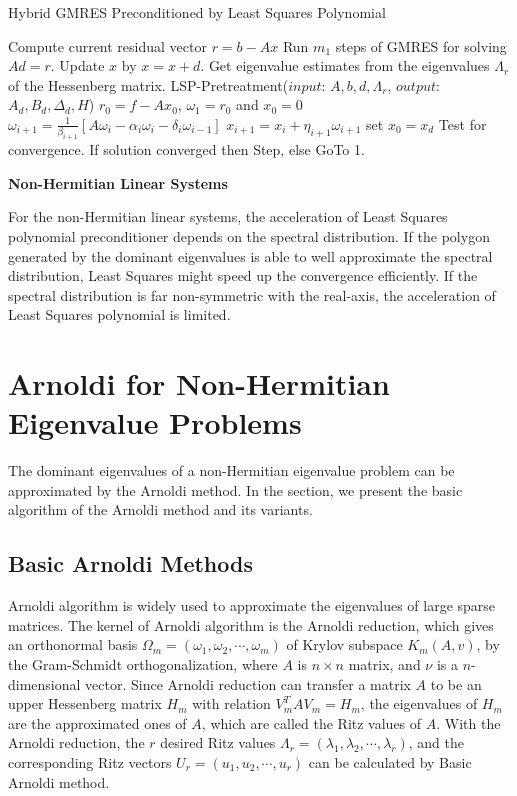 {\begin{algorithm}[htbp]
	\caption{Hybrid GMRES Preconditioned by Least Squares Polynomial}
	\label{alg:hybrid-gmres-ls}
	\begin{algorithmic}[1]
		\State  Compute current residual vector $r=b-Ax$
		\State Run $m_1$ steps of GMRES for solving $Ad = r$.
		\State  Update $x$ by $x=x+d$.
		\State  Get eigenvalue estimates from the eigenvalues $\Lambda_r$ of the Hessenberg matrix.
		\State  LSP-Pretreatment($input$: $A,b,d,\Lambda_r$, $output$: $A_d, B_d, \Delta_d, H$)
		\State  $r_0=f-Ax_0$, $\omega_1 = r_0$ and $x_0=0$
		\State  $\omega_{i+1}=\frac{1}{\beta_{i+1}}[A\omega_i-\alpha_i\omega_i-\delta_i\omega_{i-1}]$
		\State  $x_{i+1}=x_i+\eta_{i+1}\omega_{i+1}$
		\EndFor
		\EndFor
		\State  set $x_0=x_d$
		\State  Test for convergence.
		\State  If solution converged then Step, else GoTo 1.
	\end{algorithmic}
\end{algorithm}

\textbf{Non-Hermitian Linear Systems}

For the non-Hermitian linear systems, the acceleration of Least Squares polynomial preconditioner depends on the spectral distribution. If the polygon generated by the dominant eigenvalues is able to well approximate the spectral distribution, Least Squares might speed up the convergence efficiently. If the spectral distribution is far non-symmetric with the real-axis, the acceleration of Least Squares polynomial is limited. 

\section{Arnoldi for Non-Hermitian Eigenvalue Problems}

The dominant eigenvalues of a non-Hermitian eigenvalue problem can be approximated by the Arnoldi method. In the section, we present the basic algorithm of the Arnoldi method and its variants.

\subsection{Basic Arnoldi Methods}
Arnoldi algorithm \cite{arnoldi1951principle} is widely used to approximate the eigenvalues of large sparse matrices. The kernel of Arnoldi algorithm is the Arnoldi reduction, which gives an orthonormal basis \(\Omega_m = (\omega_1,\omega_2,\cdots,\omega_m)\) of Krylov subspace \(K_m(A,v)\), by the Gram-Schmidt orthogonalization, where \(A\) is  \(n \times n\) matrix, and $\nu$ is a \(n\)-dimensional vector. Since Arnoldi reduction can transfer a matrix \(A\) to be an upper Hessenberg matrix \(H_m\) with relation $V_m^T A V_m = H_m$, the eigenvalues of \(H_m\) are the approximated ones of \(A\), which are called the Ritz values of \(A\). With the Arnoldi reduction, the $r$ desired Ritz values $\Lambda_r=(\lambda_1,\lambda_2,\cdots,\lambda_r)$, and the corresponding Ritz vectors $U_r=(u_1,u_2,\cdots,u_r)$ can be calculated by Basic Arnoldi method.

}
